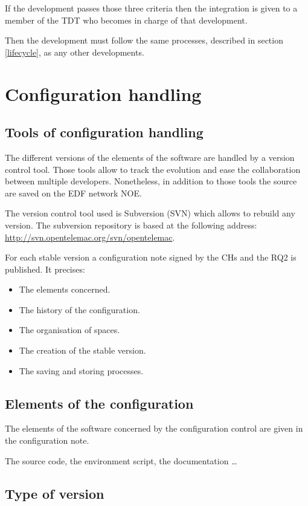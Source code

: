 If the development passes those three criteria then the integration is given to
a member of the TDT who becomes in charge of that development.

Then the development must follow the same processes, described in section
\ref{lifecycle}, as any other developments.

\section{Configuration handling}
\label{conf}

\subsection{Tools of configuration handling}

The different versions of the elements of the \telemacsystem software are handled by a
version control tool. Those tools allow to track the evolution and ease the
collaboration between multiple developers. Nonetheless, in addition to those
tools the source are saved on the EDF network NOE. 

The version control tool used is Subversion (SVN) which allows to rebuild any
version. The subversion repository is based at the following address:
\url{http://svn.opentelemac.org/svn/opentelemac}.

For each stable version a configuration note signed by the CHs and the RQ2 is published. It precises:
\begin{itemize}
\item The elements concerned.
\item The history of the configuration.
\item The organisation of spaces.
\item The creation of the stable version.
\item The saving and storing processes.
\end{itemize}

\subsection{Elements of the configuration}

The elements of the \telemacsystem software concerned by the configuration control are
given in the configuration note. 

The source code, the environment script, the documentation \ldots

\subsection{Type of version}

